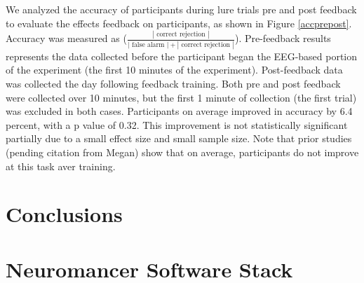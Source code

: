 \documentclass[12pt]{report}
\begin{document}
	We analyzed the accuracy of participants during lure trials pre and post feedback to evaluate the effects feedback on participants, as shown in Figure \ref{accprepost}.  Accuracy was measured as ($\frac{|\text{ correct rejection }|}{|\text{ false alarm }| + |\text{ correct rejection }|}$).  Pre-feedback results represents the data collected before the participant began the EEG-based portion of the experiment (the first 10 minutes of the experiment).  Post-feedback data was collected the day following feedback training.  Both pre and post feedback were collected over 10 minutes, but the first 1 minute of collection (the first trial) was excluded in both cases.  Participants on average improved in accuracy by 6.4 percent, with a p value of 0.32.  This improvement is not statistically significant partially due to a small effect size and small sample size.  Note that prior studies (pending citation from Megan) show that on average, participants do not improve at this task aver training.

\chapter{Conclusions}


\appendix

\chapter{Neuromancer Software Stack}


{}

\end{document}
